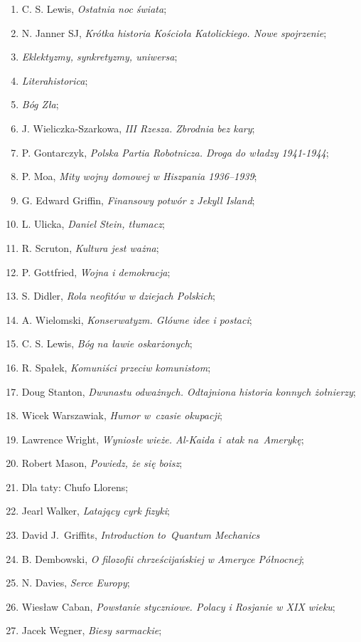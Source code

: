 \documentclass[a4paper,11pt]{article}
\begin{document}
\begin{enumerate}
\item C. S. Lewis, \emph{Ostatnia noc świata};
\item N. Janner SJ, \emph{Krótka historia Kościoła Katolickiego. Nowe
    spojrzenie};
\item \emph{Eklektyzmy, synkretyzmy, uniwersa};
\item \emph{Literahistorica};
\item \emph{Bóg Zła};
\item J. Wieliczka-Szarkowa, \emph{III Rzesza. Zbrodnia bez kary};
\item P. Gontarczyk, \emph{Polska Partia Robotnicza. Droga do władzy
    1941-1944};
\item P. Moa, \emph{Mity wojny domowej w Hiszpania 1936--1939};
\item G. Edward Griffin, \emph{Finansowy potwór z Jekyll Island};
\item L. Ulicka, \emph{Daniel Stein, tłumacz};
\item R. Scruton, \emph{Kultura jest ważna};
\item P. Gottfried, \emph{Wojna i demokracja};
\item S. Didler, \emph{Rola neofitów w dziejach Polskich};
\item A. Wielomski, \emph{Konserwatyzm. Główne idee i postaci};
\item C. S. Lewis, \emph{Bóg na ławie oskarżonych};
\item R. Spałek, \emph{Komuniści przeciw komunistom};
\item Doug Stanton, \emph{Dwunastu odważnych. Odtajniona historia
    konnych żołnierzy};
\item Wicek Warszawiak, \emph{Humor w~czasie okupacji};
\item Lawrence Wright, \emph{Wyniosłe wieże. Al-Kaida i~atak
    na~Amerykę};
\item Robert Mason, \emph{Powiedz, że się boisz};
\item Dla taty: Chufo Llorens;
\item Jearl Walker, \emph{Latający cyrk fizyki};
\item David J.~Griffits, \emph{Introduction to~Quantum Mechanics}
\item B. Dembowski, \emph{O filozofii chrześcijańskiej w Ameryce
    Północnej};
\item N. Davies, \emph{Serce Europy};
\item Wiesław Caban, \emph{Powstanie styczniowe. Polacy i Rosjanie w
    XIX wieku};
\item Jacek Wegner, \emph{Biesy sarmackie};

\end{enumerate}
\end{document}
